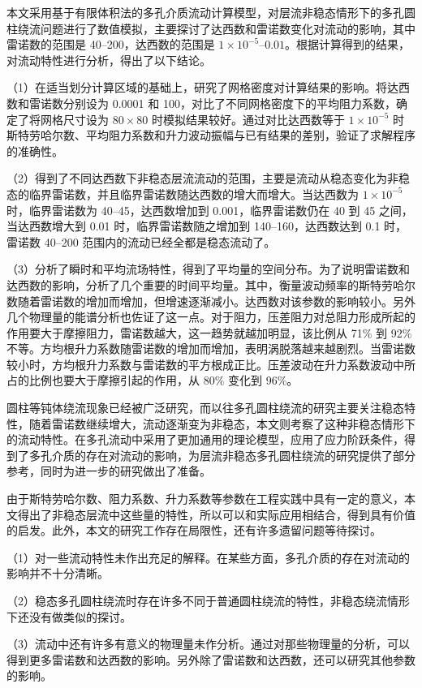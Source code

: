 \begin{conclusions}

本文采用基于有限体积法的多孔介质流动计算模型，对层流非稳态情形下的多孔圆柱绕流问题进行了数值模拟，主要探讨了达西数和雷诺数变化对流动的影响，其中雷诺数的范围是 40--200，达西数的范围是 $1\times 10^{-5}$--$0.01$。根据计算得到的结果，对流动特性进行分析，得出了以下结论。

（1）在适当划分计算区域的基础上，研究了网格密度对计算结果的影响。将达西数和雷诺数分别设为 0.0001 和 100，对比了不同网格密度下的平均阻力系数，确定了将网格尺寸设为 $80\times 80$ 时模拟结果较好。通过对比达西数等于 $1\times 10^{-5}$ 时斯特劳哈尔数、平均阻力系数和升力波动振幅与已有结果的差别，验证了求解程序的准确性。

（2）得到了不同达西数下非稳态层流流动的范围，主要是流动从稳态变化为非稳态的临界雷诺数，并且临界雷诺数随达西数的增大而增大。当达西数为 $1\times 10^{-5}$ 时，临界雷诺数为 40--45，达西数增加到 0.001，临界雷诺数仍在 40 到 45 之间，当达西数增大到 0.01 时，临界雷诺数随之增加到 140--160，达西数达到 0.1 时，雷诺数 40--200 范围内的流动已经全都是稳态流动了。

（3）分析了瞬时和平均流场特性，得到了平均量的空间分布。为了说明雷诺数和达西数的影响，分析了几个重要的时间平均量。其中，衡量波动频率的斯特劳哈尔数随着雷诺数的增加而增加，但增速逐渐减小。达西数对该参数的影响较小。另外几个物理量的能谱分析也佐证了这一点。对于阻力，压差阻力对总阻力形成所起的作用要大于摩擦阻力，雷诺数越大，这一趋势就越加明显，该比例从 71\% 到 92\% 不等。方均根升力系数随雷诺数的增加而增加，表明涡脱落越来越剧烈。当雷诺数较小时，方均根升力系数与雷诺数的平方根成正比。压差波动在升力系数波动中所占的比例也要大于摩擦引起的作用，从 80\% 变化到 96\%。

圆柱等钝体绕流现象已经被广泛研究，而以往多孔圆柱绕流的研究主要关注稳态特性，随着雷诺数继续增大，流动逐渐变为非稳态，本文则考察了这种非稳态情形下的流动特性。在多孔流动中采用了更加通用的理论模型，应用了应力阶跃条件，得到了多孔介质的存在对流动的影响，为层流非稳态多孔圆柱绕流的研究提供了部分参考，同时为进一步的研究做出了准备。

由于斯特劳哈尔数、阻力系数、升力系数等参数在工程实践中具有一定的意义，本文得出了非稳态层流中这些量的特性，所以可以和实际应用相结合，得到具有价值的启发。此外，本文的研究工作存在局限性，还有许多遗留问题等待探讨。

（1）对一些流动特性未作出充足的解释。在某些方面，多孔介质的存在对流动的影响并不十分清晰。

（2）稳态多孔圆柱绕流时存在许多不同于普通圆柱绕流的特性，非稳态绕流情形下还没有做类似的探讨。

（3）流动中还有许多有意义的物理量未作分析。通过对那些物理量的分析，可以得到更多雷诺数和达西数的影响。另外除了雷诺数和达西数，还可以研究其他参数的影响。

\end{conclusions}
